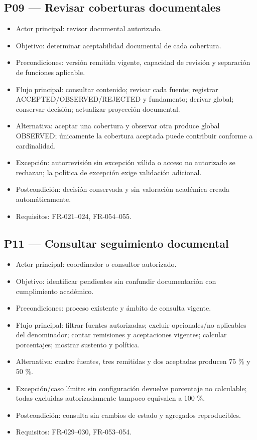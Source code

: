 \documentclass[12pt,a4paper]{report}
\providecommand{\tightlist}{\setlength{\itemsep}{0pt}\setlength{\parskip}{0pt}}
\begin{document}
\subsection{P09 --- Revisar coberturas
documentales}\label{p09-revisar-coberturas-documentales}

\begin{itemize}
\tightlist
\item
  Actor principal: revisor documental autorizado.
\item
  Objetivo: determinar aceptabilidad documental de cada cobertura.
\item
  Precondiciones: versión remitida vigente, capacidad de revisión y
  separación de funciones aplicable.
\item
  Flujo principal: consultar contenido; revisar cada fuente; registrar
  ACCEPTED/OBSERVED/REJECTED y fundamento; derivar global; conservar
  decisión; actualizar proyección documental.
\item
  Alternativa: aceptar una cobertura y observar otra produce global
  OBSERVED; únicamente la cobertura aceptada puede contribuir conforme a
  cardinalidad.
\item
  Excepción: autorrevisión sin excepción válida o acceso no autorizado
  se rechazan; la política de excepción exige validación adicional.
\item
  Postcondición: decisión conservada y sin valoración académica creada
  automáticamente.
\item
  Requisitos: FR-021--024, FR-054--055.
\end{itemize}

\subsection{P11 --- Consultar seguimiento
documental}\label{p11-consultar-seguimiento-documental}

\begin{itemize}
\tightlist
\item
  Actor principal: coordinador o consultor autorizado.
\item
  Objetivo: identificar pendientes sin confundir documentación con
  cumplimiento académico.
\item
  Precondiciones: proceso existente y ámbito de consulta vigente.
\item
  Flujo principal: filtrar fuentes autorizadas; excluir opcionales/no
  aplicables del denominador; contar remisiones y aceptaciones vigentes;
  calcular porcentajes; mostrar sustento y política.
\item
  Alternativa: cuatro fuentes, tres remitidas y dos aceptadas producen
  75 \% y 50 \%.
\item
  Excepción/caso límite: sin configuración devuelve porcentaje no
  calculable; todas excluidas autorizadamente tampoco equivalen a 100
  \%.
\item
  Postcondición: consulta sin cambios de estado y agregados
  reproducibles.
\item
  Requisitos: FR-029--030, FR-053--054.
\end{itemize}
\end{document}
